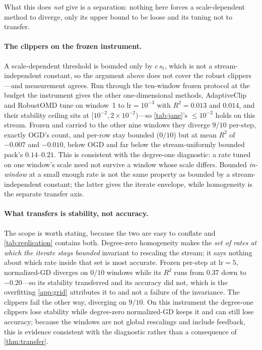 \documentclass{article}
\begin{document}
What this does \emph{not} give is a separation: nothing here forces a scale-dependent method to
diverge, only its upper bound to be loose and its tuning not to transfer.

\paragraph{The clippers on the frozen instrument.} A scale-dependent threshold is bounded only
by $c\,s_t$, which is not a stream-independent constant, so the argument above does not cover
the robust clippers---and measurement agrees. Run through the ten-window frozen protocol at the
budget the instrument gives the other one-dimensional methods, AdaptiveClip and RobustOMD tune
on window~1 to $\mathrm{lr}{=}10^{-3}$ with $R^2=0.013$ and $0.014$, and their stability ceiling
sits at $[10^{-2},2\!\times\!10^{-2})$---so \cref{tab:jane}'s $\le\!10^{-2}$ holds on this
stream. Frozen and carried to the other nine windows they diverge $9/10$ per-step, exactly OGD's
count, and per-row stay bounded ($0/10$) but at mean $R^2$ of $-0.007$ and $-0.010$, below OGD
and far below the stream-uniformly bounded pack's $0.14$--$0.21$. This is consistent with the
degree-one diagnostic: a rate tuned on one window's scale need not survive a window whose scale
differs. Bounded \emph{in-window} at a small enough rate is not the same property as bounded by
a stream-independent constant; the latter gives the iterate envelope, while homogeneity is the
separate transfer axis.

\paragraph{What transfers is stability, not accuracy.} The scope is worth stating, because the
two are easy to conflate and \cref{tab:replication} contains both. Degree-zero homogeneity makes
the \emph{set of rates at which the iterate stays bounded} invariant to rescaling the stream; it
says nothing about which rate inside that set is most accurate. Frozen per-step at
$\mathrm{lr}{=}5$, normalized-GD diverges on $0/10$ windows while its $R^2$ runs from $0.37$ down
to $-0.20$---so its stability transferred and its accuracy did not, which is the
overfitting \cref{app:grid} attributes it to and not a failure of the invariance. The clippers
fail the other way, diverging on $9/10$. On this instrument the degree-one clippers lose
stability while degree-zero normalized-GD keeps it and can still lose accuracy; because the
windows are not global rescalings and include feedback, this is evidence consistent with the
diagnostic rather than a consequence of \cref{thm:transfer}.
\end{document}
